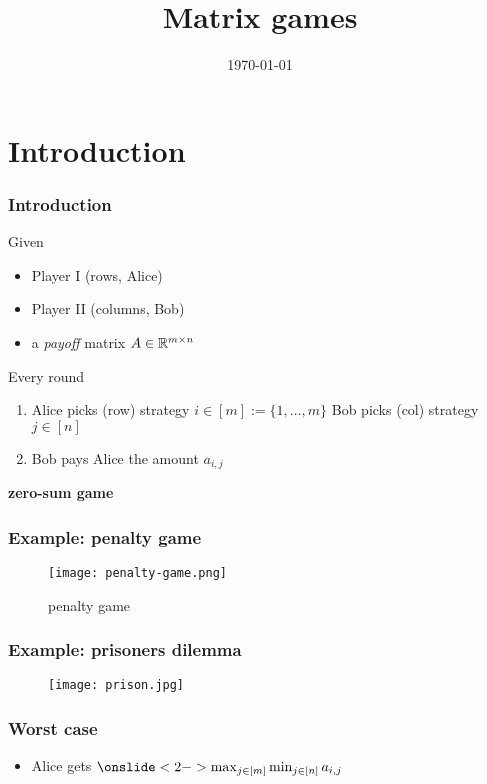 \documentclass{beamer}
\title{Matrix games}
\date{\today}
\begin{document}
\maketitle
\frame{\tableofcontents[currentsection]}

\section{Introduction}%

\begin{frame}
  \frametitle{Introduction}
  Given
  \begin{itemize}
    \item Player I (rows, Alice)
          \item Player II (columns, Bob)
          \item a \emph{payoff} matrix $A \in \mathbb{R}^{m \times n}$
  \end{itemize}
  Every round
  \begin{enumerate}
    \item Alice picks (row) strategy $i\in [m]:= \{1,\dots, m\}$
          Bob picks (col) strategy $j\in [n]$
    \item Bob pays Alice the amount $a_{i,j}$
  \end{enumerate}
  \begin{center}
    \textbf{zero-sum game}
  \end{center}
\end{frame}

\begin{frame}
  \frametitle{Example: penalty game}
  \begin{figure}[ht]
    \centering
    \texttt{[image: penalty-game.png]}
    \caption{penalty game}
  \end{figure}
\end{frame}

\begin{frame}
  \frametitle{Example: prisoners dilemma}
  \begin{figure}[ht]
    \centering
    \texttt{[image: prison.jpg]}
    \caption{\label{fig:label} }
  \end{figure}
\end{frame}

\begin{frame}
  \frametitle{Worst case}

  \begin{itemize}
    \item Alice gets $\onslide<2->{\max_{j\in [m]}}\min_{j\in [n]} a_{i,j}$
  \end{itemize}
\end{frame}
\end{document}
